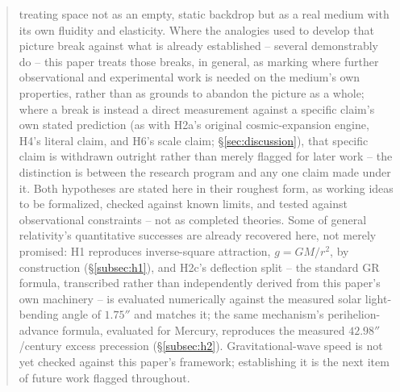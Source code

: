 \documentclass[12pt, a4paper]{article}
\begin{document}
\begin{abstract}
treating space not as an empty, static backdrop but as a real medium
with its own fluidity and elasticity. Where the analogies used to
develop that picture break against what is already established --
several demonstrably do -- this paper treats those breaks, in
general, as marking where further observational and experimental work
is needed on the medium's own properties, rather than as grounds to
abandon the picture as a whole; where a break is instead a direct
measurement against a specific claim's own stated prediction (as with
H2a's original cosmic-expansion engine, H4's literal claim, and H6's
scale claim; \S\ref{sec:discussion}), that specific claim is withdrawn
outright rather than merely flagged for later work -- the distinction
is between the research program and any one claim made under it.
Both hypotheses are stated here in their roughest form, as
working ideas to be formalized, checked against known limits, and
tested against observational constraints -- not as completed
theories. Some of general relativity's quantitative successes are
already recovered here, not merely promised: H1 reproduces
inverse-square attraction, $g=GM/r^2$, by construction
(\S\ref{subsec:h1}), and H2c's deflection split -- the standard GR
formula, transcribed rather than independently derived from this
paper's own machinery -- is evaluated numerically against the
measured solar light-bending angle of $1.75''$ and matches it; the
same mechanism's perihelion-advance formula, evaluated for Mercury,
reproduces the measured $42.98''$/century excess precession
(\S\ref{subsec:h2}). Gravitational-wave speed is not yet checked
against this paper's framework; establishing it is the next item of
future work flagged throughout.


\end{abstract}
\end{document}
